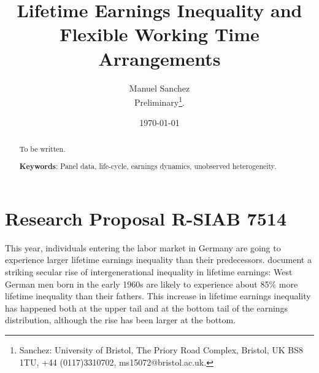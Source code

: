 \documentclass[12pt, a4paper]{article}
\begin{document}
\date{\today}
\begin{titlepage}


\title{\textbf{Lifetime Earnings Inequality and Flexible Working Time Arrangements}}

\author{Manuel Sanchez\\
Preliminary\thanks{
Sanchez: University of Bristol, The Priory Road Complex, Bristol, UK BS8 1TU, +44 (0117)3310702, ms15072@bristol.ac.uk.}.}

\maketitle

\vspace{-0.5 cm}
\begin{abstract}
\vspace{+0.5 cm}
\noindent
To be written.

\vspace{+0.5 cm}
\textbf{Keywords}: Panel data, life-cycle, earnings dynamics, unobserved heterogeneity.\\
\end{abstract}

\thispagestyle{empty}
\end{titlepage}

\newpage
\setcounter{page}{1}

\setlength{\parindent}{10pt}
\section{Research Proposal R-SIAB 7514} 

This year, individuals entering the labor market in Germany are going to experience larger lifetime earnings inequality than their predecessors. \cite{BoCo15} document a striking secular rise of intergenerational inequality in lifetime earnings: West German men born in the early 1960s are likely to experience about 85\% more lifetime inequality than their fathers. This increase in lifetime earnings inequality has happened both at the upper tail and at the bottom tail of the earnings distribution, although the rise has been larger at the bottom. 


\end{document}
